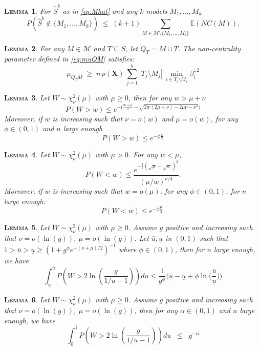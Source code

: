 \documentclass[aos]{imsart}
\theoremstyle{plain}
\newtheorem{lem}{\textsc{Lemma}}[section]
\newcommand{\E}{\mathbb{E}}
\newcommand{\bs}{\boldsymbol}
\begin{document}
\begin{supplement}
\begin{lem}\label{lem:L0toL1convergencegen} For $\hat S^b$ as in \eqref{eq:Mhat} and any $k$ models $M_1,\ldots,M_k$
$$P(\hat{S}^b\not\in \{M_1,\ldots,M_k\})\;\leq\; (k+1) \sum_{M \in \mathcal{M}\setminus \{M_1,\ldots,M_k\}}\E\left( NC(M)\right).$$
\end{lem}

\begin{lem}\label{lem:boundrhogen}
 For any $M\in\mathcal{M}$ and $T\subseteq S$, let $Q_T=M \cup T$. The non-centrality parameter defined in \eqref{eq:muQM} satisfies: 
\begin{equation}
    \mu_{Q_TM}\; \geq \;n\,\rho(\bs X)\,\sum_{j=1}^b|T_j\setminus M_j|\,\min_{i\in T_j\setminus M_j}{\beta_{i}^{\star}}^2
\end{equation}
\end{lem}

\begin{lem}\label{lemma:s1s3}
Let $W\sim\chi_{\nu}^2(\mu)$ with $\mu \geq 0$, then for any $w>\mu+\nu$
$$P(W > w) \leq e^{-\big(\frac{w+\mu}{2}  - \sqrt{2w( 2 \mu+ \nu)-2 \mu \nu - \nu^2 } \big)} $$
Moreover, if $w$ is increasing such that $\nu=o(w)$ and $\mu=o(w)$, for any $\phi\in(0,1)$ and $n$ large enough
$$P(W > w)  \leq  e^{-\phi\frac{w}{2}}$$
\end{lem}

\begin{lem}\label{lemma:s2} Let $W \sim \chi_\nu^2(\mu)$ with $\mu>0$. For any $w<\mu$, 
$$
P(W<w) \leq \frac{e^{-\frac{1}{2}(\sqrt{\mu}-\sqrt{w})^2}}{(\mu / w)^{\nu / 4}}.$$
Moreover, if $w$ is increasing such that $w=o(\mu)$, for any $\phi\in(0,1)$, for $n$ large enough:
$$
P(W<w) \leq e^{-\phi\frac{\mu}{2}}.$$
\end{lem}

\begin{lem}\label{lemma:s18} 
    Let $W\sim \chi_\nu^2(\mu)$ with $\mu \geq 0$. Assume $g$ positive and increasing such that $\nu=o(\ln(g))$, $\mu=o(\ln(g))$. Let $\bar{u},\underline{u}$ in $(0,1)$ such that $1>\bar{u}>\underline{u}\geq\left(1+g^{\phi}e^{-(\nu+\mu)/2}\right)^{-1}$ where $\phi\in(0,1)$, then for $n$ large enough, we have
$$
\int_{\underline{u}}^{\bar{u}} P\left(W>2\ln \left(\frac{g}{1 / u-1}\right)\right) d u \leq  \frac{1}{g^{\phi}}\Big(\bar{u}-\underline{u}+\phi\ln\Big(\frac{\bar{u}}{\underline{u}}\Big)\Big)
$$

\end{lem}

\begin{lem}\label{lemma:s20}
 Let $W\sim \chi_\nu^2(\mu)$ with $\mu \geq 0$. Assume $g$ positive and increasing such that $\nu=o(\ln(g))$, $\mu=o(\ln(g))$, then for any $\alpha\in(0,1)$ and $n$ large enough, we have
$$
\int_0^1 P\left(W>2 \ln \left(\frac{g}{1 / u-1}\right)\right) d u\;\; \leq\;\;  g^{-\alpha}$$
\end{lem}



\end{supplement}
\end{document}
